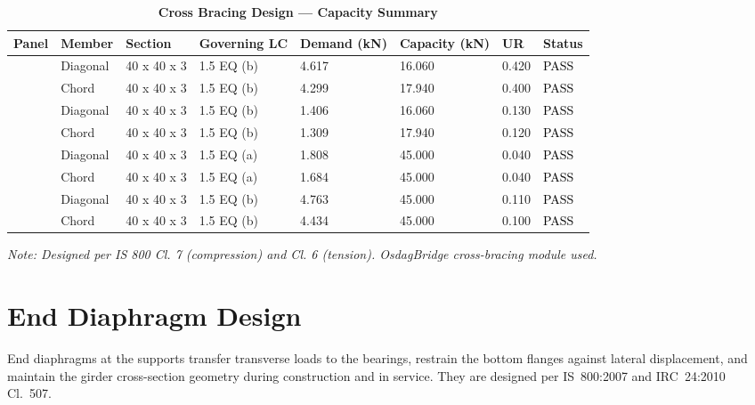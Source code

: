 \documentclass[12pt,a4paper]{report}
\numberwithin{table}{chapter}
\numberwithin{figure}{chapter}
\begin{document}
\vspace{1em}
\begin{longtable}{|C{2.0cm}|L{1.8cm}|C{2.2cm}|C{3.0cm}|C{1.8cm}|C{1.8cm}|C{1.2cm}|C{1.8cm}|}
\caption{\textbf{Cross Bracing Design --- Capacity Summary}}
\hline
\textbf{Panel} & \textbf{Member} & \textbf{Section} & \textbf{Governing LC} & \textbf{Demand (kN)} & \textbf{Capacity (kN)} & \textbf{UR} & \textbf{Status} \\[6pt]
\hline
{} & Diagonal & 40 x 40 x 3 & 1.5 EQ (b) & 4.617 & 16.060 & 0.420 & \textcolor{black}{PASS} \\[6pt]
 & Chord & 40 x 40 x 3 & 1.5 EQ (b) & 4.299 & 17.940 & 0.400 & \textcolor{black}{PASS} \\[6pt]
\hline
{} & Diagonal & 40 x 40 x 3 & 1.5 EQ (b) & 1.406 & 16.060 & 0.130 & \textcolor{black}{PASS} \\[6pt]
 & Chord & 40 x 40 x 3 & 1.5 EQ (b) & 1.309 & 17.940 & 0.120 & \textcolor{black}{PASS} \\[6pt]
\hline
{} & Diagonal & 40 x 40 x 3 & 1.5 EQ (a) & 1.808 & 45.000 & 0.040 & \textcolor{black}{PASS} \\[6pt]
 & Chord & 40 x 40 x 3 & 1.5 EQ (a) & 1.684 & 45.000 & 0.040 & \textcolor{black}{PASS} \\[6pt]
\hline
{} & Diagonal & 40 x 40 x 3 & 1.5 EQ (b) & 4.763 & 45.000 & 0.110 & \textcolor{black}{PASS} \\[6pt]
 & Chord & 40 x 40 x 3 & 1.5 EQ (b) & 4.434 & 45.000 & 0.100 & \textcolor{black}{PASS} \\[6pt]
\hline
\end{longtable}
\noindent\textit{Note: Designed per IS 800 Cl. 7 (compression) and Cl. 6 (tension). OsdagBridge cross-bracing module used.}

\section{End Diaphragm Design}
\label{sec:end-diaphragm}

End diaphragms at the supports transfer transverse loads to the bearings, restrain the bottom flanges against lateral displacement, and maintain the girder cross-section geometry during construction and in service. They are designed per IS~800:2007 and IRC~24:2010 Cl.~507.
\end{document}

